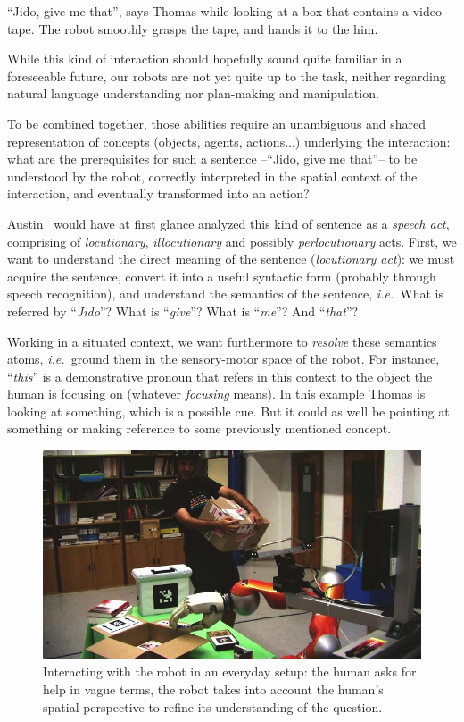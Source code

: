 \documentclass[twocolumn]{svjour3}
\newcommand{\ie}{{\textit{i.e.~}}}
\begin{document}
``Jido, give me that'', says Thomas while looking at a box that contains a
video tape. The robot smoothly grasps the tape, and hands it to the him.

While this kind of interaction should hopefully sound quite familiar in a
foreseeable future, our robots are not yet quite up to the task, neither
regarding natural language understanding nor plan-making and manipulation.

To be combined together, those abilities require an unambiguous and shared
representation of concepts (objects, agents, actions...) underlying the
interaction: what are the prerequisites for such a sentence --``Jido,
give me that''-- to be understood by the robot, correctly interpreted in the
spatial context of the interaction, and eventually transformed into an action?

Austin~\cite{Austin1962} would have at first glance analyzed this kind of
sentence as a \emph{speech act}, comprising of \emph{locutionary},
\emph{illocutionary} and possibly \emph{perlocutionary} acts. First, we want to
understand the direct meaning of the sentence (\emph{locutionary act}): we must
acquire the sentence, convert it into a useful syntactic form (probably through
speech recognition), and understand the semantics of the sentence, \ie What is
referred by ``\textit{Jido}''? What is ``\textit{give}''? What is
``\textit{me}''? And ``\textit{that}''?

Working in a situated context, we want furthermore to \emph{resolve} these
semantics atoms, \ie ground them in the sensory-motor space of the robot. For
instance, ``\textit{this}'' is a demonstrative pronoun that refers in this
context to the object the human is focusing on (whatever \textit{focusing}
means). In this example Thomas is looking at something, which is a possible
cue. But it could as well be pointing at something or making reference to some
previously mentioned concept. 

\begin{figure}%
	\centering
	\includegraphics[width=1.0\linewidth]{images/pt.jpg} 
	\caption{Interacting with
	the robot in an everyday setup: the human asks for help in vague terms, the
	robot takes into account the human's spatial perspective to refine its
	understanding of the question.} 
	\label{fig|vpt} 
\end{figure}
\end{document}
